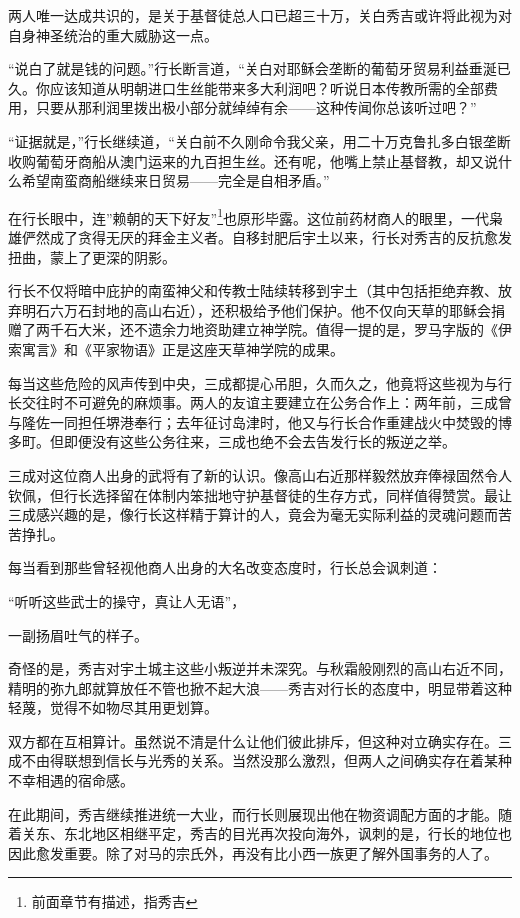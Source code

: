 \documentclass[
]{article}
\begin{document}
两人唯一达成共识的，是关于基督徒总人口已超三十万，关白秀吉或许将此视为对自身神圣统治的重大威胁这一点。

``说白了就是钱的问题。''行长断言道，``关白对耶稣会垄断的葡萄牙贸易利益垂涎已久。你应该知道从明朝进口生丝能带来多大利润吧？听说日本传教所需的全部费用，只要从那利润里拨出极小部分就绰绰有余------这种传闻你总该听过吧？''

``证据就是，''行长继续道，``关白前不久刚命令我父亲，用二十万克鲁扎多白银垄断收购葡萄牙商船从澳门运来的九百担生丝。还有呢，他嘴上禁止基督教，却又说什么希望南蛮商船继续来日贸易------完全是自相矛盾。''

在行长眼中，连''赖朝的天下好友''\footnote{前面章节有描述，指秀吉}也原形毕露。这位前药材商人的眼里，一代枭雄俨然成了贪得无厌的拜金主义者。自移封肥后宇土以来，行长对秀吉的反抗愈发扭曲，蒙上了更深的阴影。

行长不仅将暗中庇护的南蛮神父和传教士陆续转移到宇土（其中包括拒绝弃教、放弃明石六万石封地的高山右近），还积极给予他们保护。他不仅向天草的耶稣会捐赠了两千石大米，还不遗余力地资助建立神学院。值得一提的是，罗马字版的《伊索寓言》和《平家物语》正是这座天草神学院的成果。

每当这些危险的风声传到中央，三成都提心吊胆，久而久之，他竟将这些视为与行长交往时不可避免的麻烦事。两人的友谊主要建立在公务合作上：两年前，三成曾与隆佐一同担任堺港奉行；去年征讨岛津时，他又与行长合作重建战火中焚毁的博多町。但即便没有这些公务往来，三成也绝不会去告发行长的叛逆之举。

三成对这位商人出身的武将有了新的认识。像高山右近那样毅然放弃俸禄固然令人钦佩，但行长选择留在体制内笨拙地守护基督徒的生存方式，同样值得赞赏。最让三成感兴趣的是，像行长这样精于算计的人，竟会为毫无实际利益的灵魂问题而苦苦挣扎。

每当看到那些曾轻视他商人出身的大名改变态度时，行长总会讽刺道：

``听听这些武士的操守，真让人无语''，

一副扬眉吐气的样子。

奇怪的是，秀吉对宇土城主这些小叛逆并未深究。与秋霜般刚烈的高山右近不同，精明的弥九郎就算放任不管也掀不起大浪------秀吉对行长的态度中，明显带着这种轻蔑，觉得不如物尽其用更划算。

双方都在互相算计。虽然说不清是什么让他们彼此排斥，但这种对立确实存在。三成不由得联想到信长与光秀的关系。当然没那么激烈，但两人之间确实存在着某种不幸相遇的宿命感。

在此期间，秀吉继续推进统一大业，而行长则展现出他在物资调配方面的才能。随着关东、东北地区相继平定，秀吉的目光再次投向海外，讽刺的是，行长的地位也因此愈发重要。除了对马的宗氏外，再没有比小西一族更了解外国事务的人了。
\end{document}
